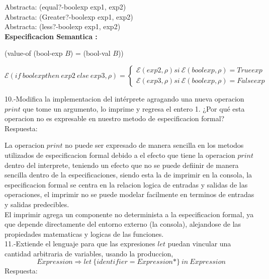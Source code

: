 \documentclass{article}
\begin{document}
Abstracta: (equal?-boolexp exp1, exp2)\\

Abstracta: (Greater?-boolexp exp1, exp2)\\

Abstracta: (less?-boolexp exp1, exp2)\\

\textbf{Especificacion Semantica :} \newline

(value-of (bool-exp $B$) = (bool-val $B$))

$$
\mathcal{E}(if \: bool exp then \: exp2 \: else \: exp3,\rho) =
\begin{cases}
    \mathcal{E}(exp2,\rho) si \: \mathcal{E}(boolexp, \rho) = Trueexp \\
    \mathcal{E}(exp3,\rho) si \: \mathcal{E}(boolexp, \rho) = Falseexp 
\end{cases}
$$

10.-Modifica la implementacion del intérprete agragando una nueva operacion $print$ que tome un argumento, lo imprime y regresa el entero 1. ¿Por qué esta operacion no es expresable en nuestro metodo de especificacion formal? \newline
Respuesta: \newline

La operacion $print$ no puede ser expresado de manera sencilla en los metodos utilizados de especificacion formal debido a el efecto que tiene la operacion $print$ dentro del interprete, teniendo un efecto que no se puede defiinir de manera sencilla dentro de la especificaciones, siendo esta la de imprimir en la consola, la especificacion formal se centra en la relacion logica de entradas y salidas de las operaciones, el imprimir no se puede modelar facilmente en terminos de entradas y salidas predecibles.\\

El imprimir agrega un componente no determinista a la especificacion formal, ya que depende directamente del entorno externo (la consola), alejandose de las propiedades matematicas y logicas de las funciones. \\

11.-Extiende el lenguaje para que las expresiones $let$ puedan vincular una cantidad arbitraria de variables, usando la produccion,\newline
$$
Expression \Rightarrow  let \: \{ identifier = Expression* \}   \: in \: Expression
$$
Respuesta: \newline
\end{document}
